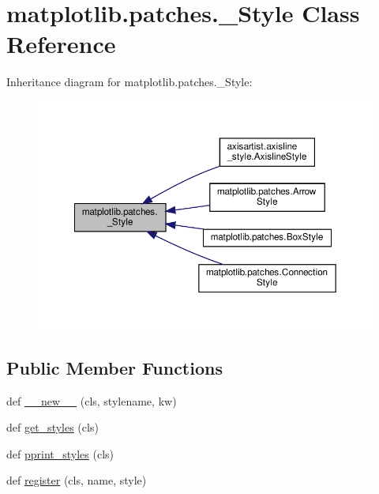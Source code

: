 \hypertarget{classmatplotlib_1_1patches_1_1__Style}{}\section{matplotlib.\+patches.\+\_\+\+Style Class Reference}
\label{classmatplotlib_1_1patches_1_1__Style}


Inheritance diagram for matplotlib.\+patches.\+\_\+\+Style\+:
\nopagebreak
\begin{figure}[H]
\begin{center}
\leavevmode
\includegraphics[width=350pt]{classmatplotlib_1_1patches_1_1__Style__inherit__graph}
\end{center}
\end{figure}
\subsection*{Public Member Functions}
\begin{DoxyCompactItemize}
\item 
def \hyperlink{classmatplotlib_1_1patches_1_1__Style_a96396993e285643acc4920a7f6f28462}{\+\_\+\+\_\+new\+\_\+\+\_\+} (cls, stylename, kw)
\item 
def \hyperlink{classmatplotlib_1_1patches_1_1__Style_aef582873693cbd4aad8ad01cec9aa611}{get\+\_\+styles} (cls)
\item 
def \hyperlink{classmatplotlib_1_1patches_1_1__Style_a2cc1b8a10325b24507d3ecd8c37a3078}{pprint\+\_\+styles} (cls)
\item 
def \hyperlink{classmatplotlib_1_1patches_1_1__Style_aa9d160563b11182297334dad8fb85329}{register} (cls, name, style)
\end{DoxyCompactItemize}


